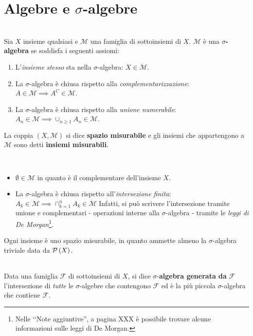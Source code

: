 \section{Algebre e $\sigma$-algebre}
\begin{define}~{}\\
	Sia $X$ insieme qualsiasi e $\mathcal{M}$ una famiglia di sottoinsiemi di $X$. $\mathcal{M}$ è una $\sigma$\textbf{-algebra}  se soddisfa i seguenti assiomi:
	\begin{enumerate}
		\item L'\textit{insieme stesso} sta nella $\sigma$-algebra: $X\in\mathcal{M}$.
		\item La $\sigma$-algebra è chiusa rispetto alla \textit{complementarizzazione}: $A\in\mathcal{M}\implies A^C\in\mathcal{M}$.
		\item La $\sigma$-algebra è chiusa rispetto alla \textit{unione numerabile}: $\displaystyle A_n\in\mathcal{M}\implies \cup_{n\geq 1}A_n\in\mathcal{M}$.
	\end{enumerate}
La coppia $\left(X,\mathcal{M}\right)$ si dice \textbf{spazio misurabile} e gli insiemi che appartengono a $\mathcal{M}$ sono detti \textbf{insiemi misurabili}.
\end{define}
\begin{observe}~{}
	\begin{itemize}
		\item $\emptyset\in\mathcal{M}$ in quanto è il complementare dell'insieme $X$.
		\item La $\sigma$-algebra è chiusa rispetto all'\textit{intersezione finita}: $A_k\in\mathcal{M}\implies\cap_{k=1}^{n}A_k\in\mathcal{M}$
		Infatti, si può scrivere l'intersezione tramite unione e complementari - operazioni interne alla $\sigma$-algebra - tramite le \textit{leggi di De Morgan}\footnote{Nelle ‘‘Note aggiuntive'', a pagina XXX è possibile trovare alcune informazioni sulle leggi di De Morgan.}.
	\end{itemize}
\end{observe}
\begin{example}
	Ogni insieme è uno spazio misurabile, in quanto ammette almeno la $\sigma$-algebra triviale data da $\mathcal{P}\left(X\right)$.
\end{example}
\begin{define}~{}\\
	Data una famiglia $\mathcal{F}$ di sottoinsiemi di $X$, si dice $\sigma$-\textbf{algebra generata da} $\mathcal{F}$ l'intersezione di \textit{tutte} le $\sigma$-algebre che contengono $\mathcal{F}$ ed è la più piccola $\sigma$-algebra che contiene $\mathcal{F}$.
\end{define}
